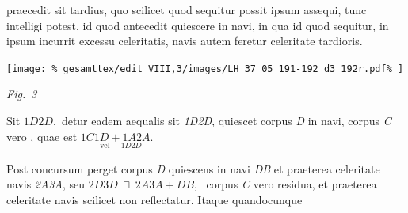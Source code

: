 praecedit sit tardius, quo scilicet quod sequitur possit 
ipsum assequi, tunc intelligi potest, id quod antecedit quiescere in navi,%
\protect{} in qua id
quod sequitur, in ipsum incurrit excessu celeritatis,%
\protect{} %
navis\protect{} autem
feretur celeritate tardioris.%
\pend
\newpage
%
%
\centerline{%
\texttt{[image: \%
gesamttex/edit\_VIII,3/images/LH\_37\_05\_191-192\_d3\_192r.pdf\%
]}} 
\vspace{0.5em}
\centerline{%
\lbrack\textit{Fig.~3}\rbrack%
}
\vspace{1.5em}
%
\pstart
Sit
%
%
$ {\scriptstyle 1}D{\scriptstyle 2}D$\lbrack,\rbrack\
detur eadem
%
%
aequalis sit \textit{{\scriptsize1}D{\scriptsize2}D}, quiescet corpus \textit{D} in navi, 
corpus \textit{C} vero 
%
,
%
quae est
$\underset{\phantom{{\scriptstyle 1}C}\, \displaystyle\text{vel}\ + {\scriptstyle 1}D{\scriptstyle 2}D}{{\scriptstyle 1}C{\scriptstyle 1}D + {\scriptstyle 1}A{\scriptstyle 2}A}$.
\rule[0cm]{0mm}{10pt}Post concursum perget corpus \textit{D}
%
%
quiescens in navi%
\protect{}
%
%
\textit{DB} et praeterea celeritate
navis \textit{{\scriptsize2}A{\scriptsize3}A}, seu
${\scriptstyle 2}D{\scriptstyle 3}D \ \sqcap \ {\scriptstyle 2}A{\scriptstyle 3}A + DB$\lbrack,\rbrack\
corpus \textit{C} vero residua,
et praeterea celeritate %
navis\protect{}
%
%
scilicet non reflectatur.
Itaque quandocunque 
%
